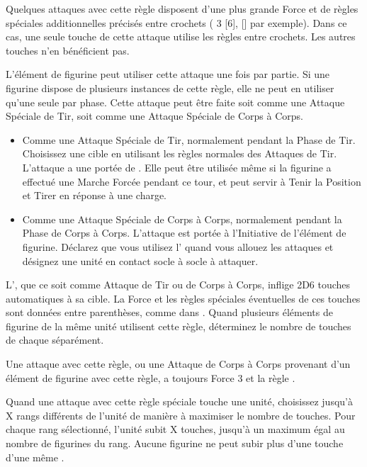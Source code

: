 Quelques attaques avec cette règle disposent d'une plus grande Force et de règles spéciales additionnelles précisés entre crochets (\Strength{} 3 [6], [] par exemple). Dans ce cas, une seule touche de cette attaque utilise les règles entre crochets. Les autres touches n'en bénéficient pas.


L'élément de figurine peut utiliser cette attaque une fois par partie. Si une figurine dispose de plusieurs instances de cette règle, elle ne peut en utiliser qu'une seule par phase. Cette attaque peut être faite soit comme une Attaque Spéciale de Tir, soit comme une Attaque Spéciale de Corps à Corps.
\begin{itemize}[label={\textbullet}]
\item Comme une Attaque Spéciale de Tir, normalement pendant la Phase de Tir. Choisissez une cible en utilisant les règles normales des Attaques de Tir. L'attaque a une portée de . Elle peut être utilisée même si la figurine a effectué une Marche Forcée pendant ce tour, et peut servir à Tenir la Position et Tirer en réponse à une charge.
\item Comme une Attaque Spéciale de Corps à Corps, normalement pendant la Phase de Corps à Corps. L'attaque est portée à l'Initiative de l'élément de figurine. Déclarez que vous utilisez l'\breathweapon{} quand vous allouez les attaques et désignez une unité en contact socle à socle à attaquer.
\end{itemize}

L'\breathweapon{}, que ce soit comme Attaque de Tir ou de Corps à Corps, inflige 2D6 touches automatiques à sa cible. La Force et les règles spéciales éventuelles de ces touches sont données entre parenthèses, comme dans \og {} \fg{}. Quand plusieurs éléments de figurine de la même unité utilisent cette règle, déterminez le nombre de touches de chaque \breathweapon{} séparément.


Une attaque avec cette règle, ou une Attaque de Corps à Corps provenant d'un élément de figurine avec cette règle, a toujours Force 3 et la règle .


Quand une attaque avec cette règle spéciale touche une unité, choisissez jusqu'à X rangs différents de l'unité de manière à maximiser le nombre de touches. Pour chaque rang sélectionné, l'unité subit X touches, jusqu'à un maximum égal au nombre de figurines du rang. Aucune figurine ne peut subir plus d'une touche d'une même \areaattack{}.

